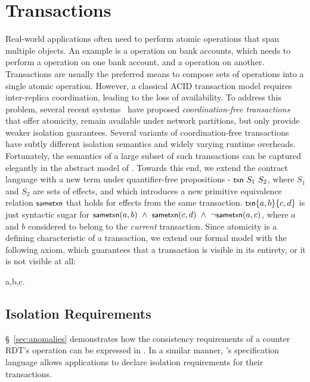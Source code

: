 \section{Transactions}
\label{sec:transactions}

Real-world applications often need to perform atomic operations that
span multiple objects. An example is a  operation on bank
accounts, which needs to perform a  operation on one bank
account, and a  operation on another. Transactions are
usually the preferred means to compose sets of operations into a
single atomic operation. However, a classical ACID transaction model
requires inter-replica coordination, leading to the loss of
availability. To address this problem, several recent
systems~\cite{Walter,Burckhardt2012,BailisHAT} have proposed
\emph{coordination-free transactions} that offer atomicity, remain
available under network partitions, but only provide weaker isolation
guarantees. Several variants of coordination-free transactions have
subtly different isolation semantics and widely varying runtime
overheads.  Fortunately, the semantics of a large subset of such
transactions can be captured elegantly in the abstract model of \name.
Towards this end, we extend the contract language with a new term
under quantifier-free propositions - ${\small {\normalfont \textsf{txn}}}~S_1~S_2$, where
$S_1$ and $S_2$ are sets of effects, and which introduces a new primitive
equivalence relation $\small {\normalfont \textsf{sametxn}}$ that holds for effects from
the same transaction. $\small {\normalfont \textsf{txn}}\{a,b\}\{c,d\}$ is just syntactic sugar
for $\small {\normalfont \textsf{sametxn}(a,b)} ~\wedge~ {\normalfont \textsf{sametxn}(c,d)} ~\wedge~
\neg{\normalfont \textsf{sametxn}(a,c)}$, where $a$ and $b$ considered to belong to the
\emph{current} transaction. Since atomicity is a defining
characteristic of a transaction, we extend our formal model with the
following axiom, which guarantees that a transaction is visible in its
entirety, or it is not visible at all:

\begin{cmathpar}
\forall a,b,c.~ ~\wedge~  ~\wedge~ 
\Rightarrow {}
\end{cmathpar}

\subsection{Isolation Requirements}

\S~\ref{sec:anomalies} demonstrates how the consistency requirements of
a counter RDT's  operation can be expressed in \name. In a
similar manner, \name's specification language allows applications to
declare isolation requirements for their transactions.


